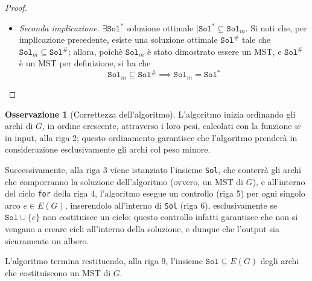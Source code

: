 \documentclass[14pt]{extreport}
\theoremstyle{definition}
\theoremstyle{definition}
\newtheorem{remark}{Osservazione}[subsection]
\begin{document}
\begin{proof}
\begin{itemize}
\begin{itemize}
                \item si noti che, considerando l'insieme di archi $(\texttt{Sol}^* \cup \{e_{k +1}\}) - \{e_j\}$, il vertice $y$ resta coperto
                \item si noti che l'arco $e_j$ non è in $\texttt{Sol}_{k +1}$, e dunque $k + 1 < j$; allora, per via dell'ordinamento degli archi alla riga $2$, necessariamente $w(e_{k +1}) \le w(e_j)$; dunque, si ha che $$\displaystyle \sum_{e \in (\texttt{Sol}^* \cup \{e_{k +1}\}) - \{e_j\}}{w(e)} \le \sum_{e \in \texttt{Sol}^*}{w(e)}$$ ma poiché $\texttt{Sol}^*$, per definizione, è soluzione ottimale, non è possibile trovare una soluzione con peso inferiore, e dunque necessariamente $$(\texttt{Sol}^* \cup \{e_{k +1}\}) - \{e_j\}$$ ha lo stesso peso di $\texttt{Sol}^*$, che costituisce un MST di $G$; allora, tale insieme di archi è una soluzione ottimale, contenente $\texttt{Sol}_{k +1}$ per definizione.
            \end{itemize}
        \item[] \textit{Seconda implicazione.} $\exists \texttt{Sol}^*$ soluzione ottimale $\mid \texttt{Sol}^* \subseteq \texttt{Sol}_m$. Si noti che, per implicazione precedente, esiste una soluzione ottimale $\texttt{Sol}^\#$ tale che $\texttt{Sol}_m \subseteq \texttt{Sol}^\#$; allora, poichè $\texttt{Sol}_m$ è stato dimostrato essere un MST, e $\texttt{Sol}^\#$ è un MST per definizione, si ha che $$\texttt{Sol}_m \subseteq \texttt{Sol}^\# \implies \texttt{Sol}_m = \texttt{Sol}^*$$
    \end{itemize}
\end{proof}

\begin{remark}[Correttezza dell'algoritmo]
    L'algoritmo inizia ordinando gli archi di $G$, in ordine crescente, attraverso i loro pesi, calcolati con la funzione $w$ in input, alla riga 2; questo ordinamento garantisce che l'algoritmo prenderà in considerazione esclusivamente gli archi col peso minore.

    Successivamente, alla riga 3 viene istanziato l'insieme \texttt{Sol}, che conterrà gli archi che comporranno la soluzione dell'algoritmo (ovvero, un MST di $G$), e all'interno del ciclo \texttt{for} della riga 4, l'algoritmo esegue un controllo (riga 5) per ogni singolo arco $e \in E(G)$, inserendolo all'interno di \texttt{Sol} (riga 6), esclusivamente se $\texttt{Sol} \cup \{e\}$ non costituisce un ciclo; questo controllo infatti garantisce che non si vengano a creare cicli all'interno della soluzione, e dunque che l'output sia sicuramente un albero.

    L'algoritmo termina restituendo, alla riga 9, l'insieme $\texttt{Sol} \subseteq E(G)$ degli archi che costituiscono un MST di $G$.
\end{remark}
\end{document}
